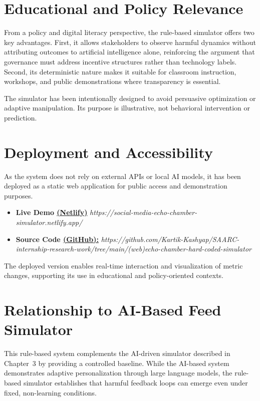 \documentclass[12pt,a4paper]{report}
\begin{document}
\section{Educational and Policy Relevance}

From a policy and digital literacy perspective, the rule-based simulator offers two key advantages. First, it allows stakeholders to observe harmful dynamics without attributing outcomes to artificial intelligence alone, reinforcing the argument that governance must address incentive structures rather than technology labels. Second, its deterministic nature makes it suitable for classroom instruction, workshops, and public demonstrations where transparency is essential.

The simulator has been intentionally designed to avoid persuasive optimization or adaptive manipulation. Its purpose is illustrative, not behavioral intervention or prediction.

\section{Deployment and Accessibility}

As the system does not rely on external APIs or local AI models, it has been deployed as a static web application for public access and demonstration purposes.

\begin{itemize}
  \item \textbf{Live Demo \href{https://social-media-echo-chamber-simulator.netlify.app/}{(Netlify)}} \textit{https://social-media-echo-chamber-simulator.netlify.app/}
  \item \textbf{Source Code \href{https://github.com/Kartik-Kashyap/SAARC-internship-research-work/tree/main/(web)echo-chamber-hard-coded-simulator}{(GitHub):}} \textit{https://github.com/Kartik-Kashyap/SAARC-internship-research-work/tree/main/(web)echo-chamber-hard-coded-simulator}
\end{itemize}

The deployed version enables real-time interaction and visualization of metric changes, supporting its use in educational and policy-oriented contexts.

\section{Relationship to AI-Based Feed Simulator}

This rule-based system complements the AI-driven simulator described in Chapter~3 by providing a controlled baseline. While the AI-based system demonstrates adaptive personalization through large language models, the rule-based simulator establishes that harmful feedback loops can emerge even under fixed, non-learning conditions.
\end{document}
